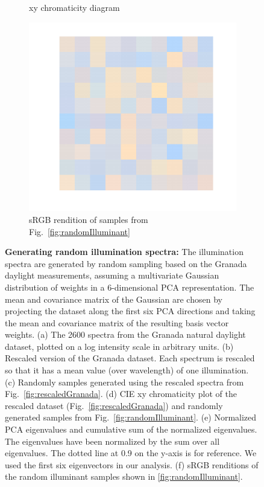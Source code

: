 \documentclass{jov}
\begin{document}
\begin{figure}
\begin{subfigure}[b]{0.3 \textwidth}
        \caption{xy chromaticity diagram}
        \label{fig:xyDiagram}
    \end{subfigure}
      	\begin{subfigure}[b]{0.3 \textwidth}
    \centering
        \includegraphics[width=\textwidth]{../Figures/Figure6/Figure6_f.pdf}
        \caption{sRGB rendition of samples from Fig.~\ref{fig:randomIlluminant}}
        \label{fig:sRGBIlluminant}
    \end{subfigure}
    \caption{{\bf Generating random illumination spectra:} The illumination spectra are generated by random sampling based on the Granada daylight measurements, assuming a multivariate Gaussian distribution of weights in a 6-dimensional PCA representation. The mean and covariance matrix of the Gaussian are chosen by projecting the dataset along the first six PCA directions and taking the mean and covariance matrix of the resulting basis vector weights. (a) The 2600 spectra from the Granada natural daylight dataset, plotted on a log intensity scale in arbitrary units. (b) Rescaled version of the Granada dataset. Each spectrum is rescaled so that it has a mean value (over wavelength) of one illumination. (c) Randomly samples generated using the rescaled spectra from Fig.~\ref{fig:rescaledGranada}. (d) CIE xy chromaticity plot of the rescaled dataset (Fig.~\ref{fig:rescaledGranada}) and randomly generated samples from Fig.~\ref{fig:randomIlluminant}. (e) Normalized PCA eigenvalues and cumulative sum of the normalized eigenvalues. The eigenvalues have been normalized by the sum over all eigenvalues. The dotted line at 0.9 on the y-axis is for reference. We used the first six eigenvectors in our analysis. (f) sRGB renditions of the random illuminant samples shown in \ref{fig:randomIlluminant}.}\label{fig:illluminationGeneration}
\end{figure}
\end{document}
